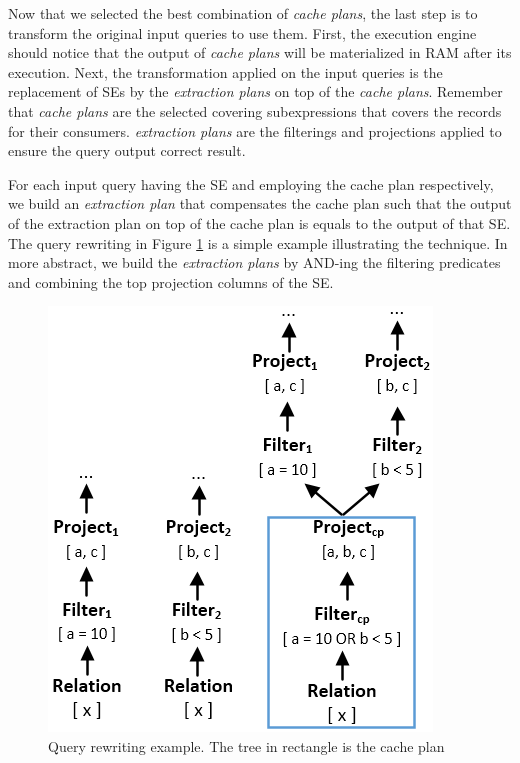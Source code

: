 Now that we selected the best combination of \emph{cache plans}, the last step is to transform the original input queries to use them. First, the execution engine should notice that the output of \emph{cache plans} will be materialized in RAM after its execution. Next, the transformation applied on the input queries is the replacement of SEs by the \emph{extraction plans} on top of the \emph{cache plans}. Remember that \emph{cache plans} are the selected covering subexpressions that covers the records for their consumers. \emph{extraction plans} are the filterings and projections applied to ensure the query output correct result.

For each input query having the SE and employing the cache plan respectively, we build an \emph{extraction plan} that compensates the cache plan such that the output of the extraction plan on top of the cache plan is equals to the output of that SE. The query rewriting in Figure \ref{fig:rewrite} is a simple example illustrating the technique. In more abstract, we build the \emph{extraction plans} by AND-ing the filtering predicates and combining the top projection columns of the SE.

\begin{figure}[!htb]
	\centering
	\includegraphics[scale=0.55]{figures/rewrite}
	\caption{Query rewriting example. The tree in rectangle is the cache plan}
   	\label{fig:rewrite}
\end{figure}